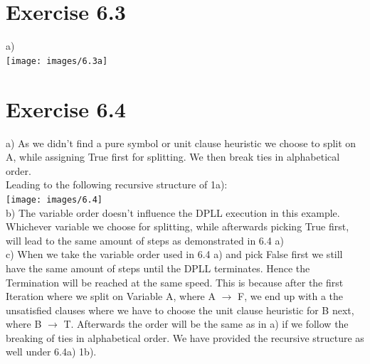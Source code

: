 \documentclass[12pt]{article}
\begin{document}
\section*{Exercise 6.3}
a)\\
\texttt{[image: images/6.3a]}\\

\section*{Exercise 6.4}
a) As we didn't find a pure symbol or unit clause heuristic we choose to split on A, while assigning True first for splitting. We then break ties in alphabetical order.\\
Leading to the following recursive structure of 1a):\\\texttt{[image: images/6.4]}\\
b) The variable order doesn't influence the DPLL execution in this example. Whichever variable we choose for splitting, while afterwards picking True first, will lead to the same amount of steps as demonstrated in 6.4 a)\\
c) When we take the variable order used in 6.4 a) and pick False first we still have the same amount of steps until the DPLL terminates. Hence the Termination will be reached at the same speed. This is because after the first Iteration where we split on Variable A, where A $\to$ F, we end up with a the unsatisfied clauses where we have to choose the unit clause heuristic for B next, where B $\to$ T. Afterwards the order will be the same as in a) if we follow the breaking of ties in alphabetical order. We have provided the recursive structure as well under 6.4a) 1b).\\
\end{document}
